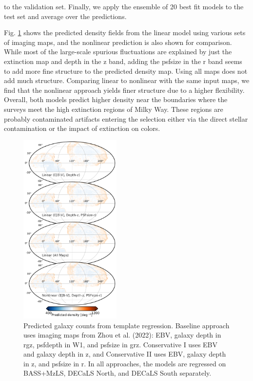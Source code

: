 to the validation set. Finally, we apply the ensemble of 20 best fit models to the test set and average over the predictions. 

Fig. \ref{fig:npred} shows the predicted density fields from the linear model using various sets of imaging maps, and the nonlinear prediction is also shown for comparison. While most of the large-scale spurious fluctuations are explained by just the extinction map and depth in the z band, adding the psfsize in the r band seems to add more fine structure to the predicted density map. Using all maps does not add much structure. Comparing linear to nonlinear with the same input maps, we find that the nonlinear approach yields finer structure due to a higher flexibility.  Overall, both models predict higher density near the boundaries where the surveys meet the high extinction regions of Milky Way. These regions are probably contaminated artifacts entering the selection either via the direct stellar contamination or the impact of extinction on colors.

\begin{figure}
    \centering
    \includegraphics[width=0.45\textwidth]{figures/npred.pdf}
    \caption{Predicted galaxy counts from template regression. Baseline approach uses imaging maps from Zhou et al. (2022): EBV, galaxy depth in rgz, psfdepth in W1, and psfsize in grz. Conservative I uses EBV and galaxy depth in z, and Conservative II uses EBV, galaxy depth in z, and psfsize in r. In all approaches, the models are regressed on BASS+MzLS, DECaLS North, and DECaLS South separately.}
    \label{fig:npred}
\end{figure}

